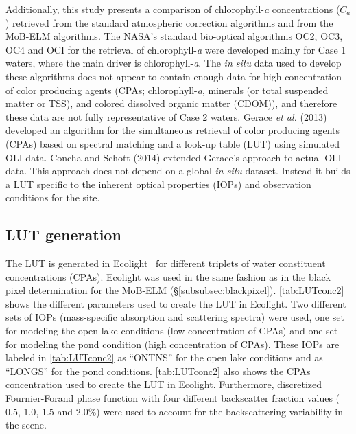 Additionally, this study presents a comparison of chlorophyll-{\it a} concentrations ($C_a$) retrieved from the standard atmospheric correction algorithms and from the MoB-ELM algorithms. The NASA's standard bio-optical algorithms OC2, OC3, OC4\cite{OReilly2000} and OCI\cite{Hu:2012} for the retrieval of chlorophyll-{\it a} were developed mainly for Case 1 waters, where the main driver is chlorophyll-{\it a}. The {\it in situ} data used to develop these algorithms does not appear to contain enough data for high concentration of color producing agents (CPAs; chlorophyll-{\it a}, minerals (or total suspended matter or TSS), and colored dissolved organic matter (CDOM)), and therefore these data are not fully representative of Case 2 waters. Gerace {\it et al.} (2013)\cite{Gerace:2013} developed an algorithm for the simultaneous retrieval of color producing agents (CPAs) based on spectral matching and a look-up table (LUT) using simulated OLI data. Concha and Schott (2014)\cite{Concha2013IGARSS} extended Gerace's approach to actual OLI data. This approach does not depend on a global {\it in situ} dataset. Instead it builds a LUT specific to the inherent optical properties (IOPs) and observation conditions for the site.
\subsection{LUT generation}
The LUT is generated in Ecolight~\cite{MobleyHE} for different triplets of water constituent concentrations (CPAs). Ecolight was used in the same fashion as in the black pixel determination for the MoB-ELM (\S\ref{subsubsec:blackpixel}). \autoref{tab:LUTconc2} shows the different parameters used to create the LUT in Ecolight. Two different sets of IOPs (mass-specific absorption and scattering spectra) were used, one set for modeling the open lake conditions (low concentration of CPAs) and one set for modeling the pond condition (high concentration of CPAs). These IOPs are labeled in \autoref{tab:LUTconc2} as ``ONTNS'' for the open lake conditions and as ``LONGS'' for the pond conditions. \autoref{tab:LUTconc2} also shows the CPAs concentration used to create the LUT in Ecolight. Furthermore, discretized Fournier-Forand phase function with four different backscatter fraction values ($0.5$, $1.0$, $1.5$ and $2.0\%$) were used to account for the backscattering variability in the scene.


